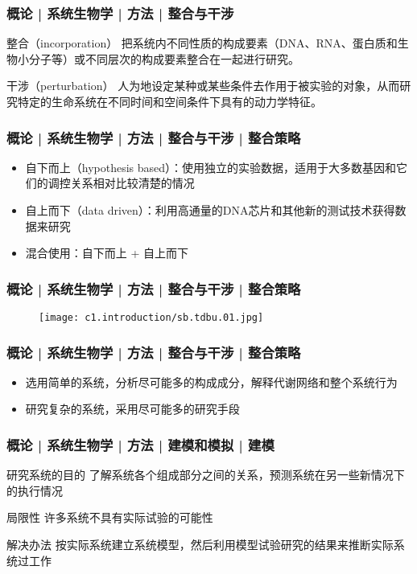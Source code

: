 \begin{frame}
  \frametitle{概论 | 系统生物学 | 方法 | 整合与干涉}
  \begin{block}{整合（incorporation）}
把系统内不同性质的构成要素（DNA、RNA、蛋白质和生物小分子等）或不同层次的构成要素整合在一起进行研究。
  \end{block}
  \pause
  \begin{block}{干涉（perturbation）}
人为地设定某种或某些条件去作用于被实验的对象，从而研究特定的生命系统在不同时间和空间条件下具有的动力学特征。 \end{block}
\end{frame}

\begin{frame}
  \frametitle{概论 | 系统生物学 | 方法 | 整合与干涉 | 整合策略}
  \begin{itemize}
    \item 自下而上（hypothesis based）：使用独立的实验数据，适用于大多数基因和它们的调控关系相对比较清楚的情况
    \item 自上而下（data driven）：利用高通量的DNA芯片和其他新的测试技术获得数据来研究
    \item 混合使用：自下而上 + 自上而下
  \end{itemize}
\end{frame}

\begin{frame}
  \frametitle{概论 | 系统生物学 | 方法 | 整合与干涉 | 整合策略}
  \begin{figure}
    \centering
    \texttt{[image: c1.introduction/sb.tdbu.01.jpg]}
  \end{figure}
\end{frame}

\begin{frame}
  \frametitle{概论 | 系统生物学 | 方法 | 整合与干涉 | 整合策略}
  \begin{itemize}
    \item 选用简单的系统，分析尽可能多的构成成分，解释代谢网络和整个系统行为
    \item 研究复杂的系统，采用尽可能多的研究手段
  \end{itemize}
\end{frame}

\begin{frame}
  \frametitle{概论 | 系统生物学 | 方法 | 建模和模拟 | 建模}
  \begin{block}{研究系统的目的}
了解系统各个组成部分之间的关系，预测系统在另一些新情况下的执行情况
  \end{block}
  \pause
  \begin{block}{局限性}
许多系统不具有实际试验的可能性
  \end{block}
  \pause
  \begin{block}{解决办法}
按实际系统建立系统模型，然后利用模型试验研究的结果来推断实际系统过工作
  \end{block}
\end{frame}

